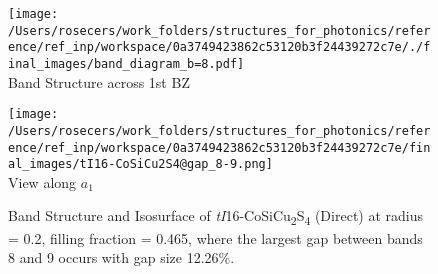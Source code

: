 \begin{figure}[H]
\begin{minipage}{0.5\textwidth}\centering
\texttt{[image: /Users/rosecers/work\_folders/structures\_for\_photonics/reference/ref\_inp/workspace/0a3749423862c53120b3f24439272c7e/./final\_images/band\_diagram\_b=8.pdf]}
\\Band Structure across 1st BZ
\end{minipage}\hfill
\begin{minipage}{0.48\textwidth}\centering
\texttt{[image: /Users/rosecers/work\_folders/structures\_for\_photonics/reference/ref\_inp/workspace/0a3749423862c53120b3f24439272c7e/final\_images/tI16-CoSiCu2S4@gap\_8-9.png]}
\\View along $a_1$ 
\end{minipage}\hfill\caption{Band Structure and Isosurface of \textit{tI}16-CoSiCu\textsubscript{2}S\textsubscript{4} (Direct) at radius = 0.2, filling fraction = 0.465, where the largest gap between bands 8 and 9 occurs with gap size 12.26\%.}

\end{figure}
\vspace{-0.25in}

